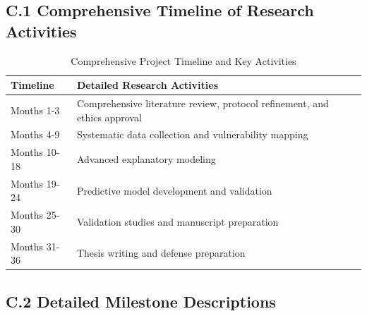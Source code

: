 \documentclass[12pt,a4paper,landscape]{article}
\begin{document}
\subsection*{C.1 Comprehensive Timeline of Research Activities}
\begin{table}[H]
    \centering
    \caption{Comprehensive Project Timeline and Key Activities}
    \label{tab:timeline}
    \begin{tabular}{L{3cm}L{12cm}}
        \toprule
        \textbf{Timeline} & \textbf{Detailed Research Activities} \\
        \midrule
        Months 1-3 & Comprehensive literature review, protocol refinement, and ethics approval \\
        \addlinespace
        Months 4-9 & Systematic data collection and vulnerability mapping \\
        \addlinespace
        Months 10-18 & Advanced explanatory modeling \\
        \addlinespace
        Months 19-24 & Predictive model development and validation \\
        \addlinespace
        Months 25-30 & Validation studies and manuscript preparation \\
        \addlinespace
        Months 31-36 & Thesis writing and defense preparation \\
        \bottomrule
    \end{tabular}
\end{table}

\subsection*{C.2 Detailed Milestone Descriptions}
\end{document}
